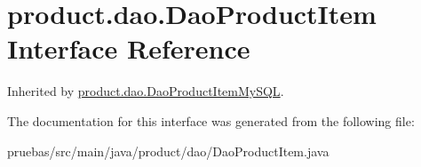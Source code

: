 \hypertarget{interfaceproduct_1_1dao_1_1_dao_product_item}{}\section{product.\+dao.\+Dao\+Product\+Item Interface Reference}
\label{interfaceproduct_1_1dao_1_1_dao_product_item}


Inherited by \mbox{\hyperlink{classproduct_1_1dao_1_1_dao_product_item_my_s_q_l}{product.\+dao.\+Dao\+Product\+Item\+My\+S\+QL}}.



The documentation for this interface was generated from the following file\+:\begin{DoxyCompactItemize}
\item 
pruebas/src/main/java/product/dao/Dao\+Product\+Item.\+java\end{DoxyCompactItemize}
